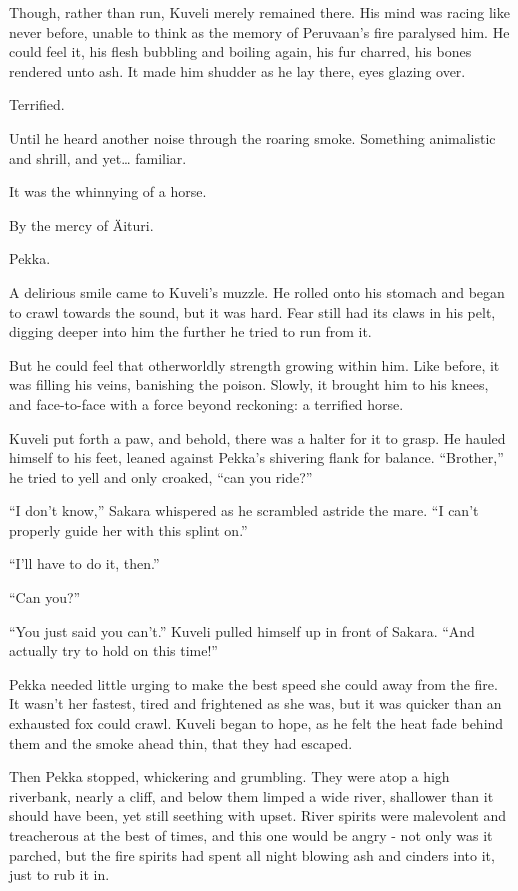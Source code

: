 Though, rather than run, Kuveli merely remained there. His mind was racing like never before, unable to think as the memory of Peruvaan's fire paralysed him. He could feel it, his flesh bubbling and boiling again, his fur charred, his bones rendered unto ash. It made him shudder as he lay there, eyes glazing over.

Terrified.

Until he heard another noise through the roaring smoke. Something animalistic and shrill, and yet\ldots{} familiar.

It was the whinnying of a horse.

By the mercy of Äituri.

Pekka.

A delirious smile came to Kuveli's muzzle. He rolled onto his stomach and began to crawl towards the sound, but it was hard. Fear still had its claws in his pelt, digging deeper into him the further he tried to run from it.

But he could feel that otherworldly strength growing within him. Like before, it was filling his veins, banishing the poison. Slowly, it brought him to his knees, and face-to-face with a force beyond reckoning: a terrified horse.

Kuveli put forth a paw, and behold, there was a halter for it to grasp. He hauled himself to his feet, leaned against Pekka's shivering flank for balance. ``Brother,'' he tried to yell and only croaked, ``can you ride?''

``I don't know,'' Sakara whispered as he scrambled astride the mare. ``I can't properly guide her with this splint on.''

``I'll have to do it, then.''

``Can you?''

``You just said you can't.'' Kuveli pulled himself up in front of Sakara. ``And actually try to hold on this time!''

Pekka needed little urging to make the best speed she could away from the fire. It wasn't her fastest, tired and frightened as she was, but it was quicker than an exhausted fox could crawl. Kuveli began to hope, as he felt the heat fade behind them and the smoke ahead thin, that they had escaped.

Then Pekka stopped, whickering and grumbling. They were atop a high riverbank, nearly a cliff, and below them limped a wide river, shallower than it should have been, yet still seething with upset. River spirits were malevolent and treacherous at the best of times, and this one would be angry - not only was it parched, but the fire spirits had spent all night blowing ash and cinders into it, just to rub it in.

